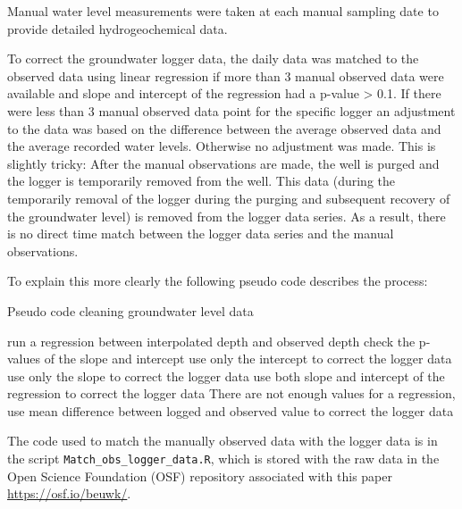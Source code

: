 \documentclass[, manuscript]{copernicus}
\begin{document}
Manual water level measurements were taken at each manual sampling date
to provide detailed hydrogeochemical data.

To correct the groundwater logger data, the daily data was matched to
the observed data using linear regression if more than 3 manual observed
data were available and slope and intercept of the regression had a
p-value \textgreater{} 0.1. If there were less than 3 manual observed
data point for the specific logger an adjustment to the data was based
on the difference between the average observed data and the average
recorded water levels. Otherwise no adjustment was made. This is
slightly tricky: After the manual observations are made, the well is
purged and the logger is temporarily removed from the well. This data
(during the temporarily removal of the logger during the purging and
subsequent recovery of the groundwater level) is removed from the logger
data series. As a result, there is no direct time match between the
logger data series and the manual observations.

To explain this more clearly the following pseudo code describes the
process:

\begin{algorithm}
\caption{Pseudo code cleaning groundwater level data}
\label{a1}
\begin{algorithmic}
        \STATE run a regression between interpolated depth and observed depth  
        \STATE check the p-values of the slope and intercept
                \STATE  use only the intercept to correct the logger data
        \ELSE
                        \STATE use only the slope to correct the logger data
                \ELSE
                       \STATE use both slope and intercept of the regression to correct the logger data
                \ENDIF
        \ENDIF
\ELSE
        \STATE There are not enough values for a regression, use mean difference between logged and observed value to correct the logger data
\ENDIF
\end{algorithmic}
\end{algorithm}

The code used to match the manually observed data with the logger data
is in the script \texttt{Match\_obs\_logger\_data.R}, which is stored
with the raw data in the Open Science Foundation (OSF) repository
associated with this paper \url{https://osf.io/beuwk/}.
\end{document}
